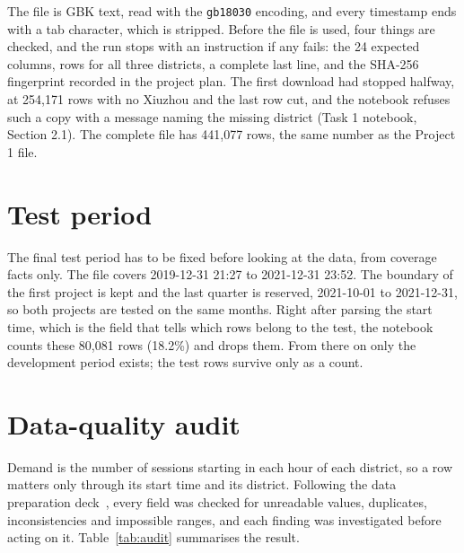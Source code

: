 \documentclass[12pt,a4paper,openany]{report}
\begin{document}
The file is GBK text, read with the \texttt{gb18030} encoding, and every timestamp ends with a tab
character, which is stripped. Before the file is used, four things are checked, and the run stops with an instruction if any fails: the 24
expected columns, rows for all three districts, a complete last line, and the SHA-256 fingerprint recorded in the
project plan. The first download had stopped halfway, at 254,171 rows with no
Xiuzhou and the last row cut, and the notebook refuses such a copy with a message naming the missing district (Task 1
notebook, Section 2.1). The complete file has 441,077 rows, the same number as the Project 1 file.

\section{Test period}\label{sec:test}

The final test period has to be fixed before looking at the data, from coverage facts only. The file covers
2019-12-31 21:27 to 2021-12-31 23:52. The boundary of the first project is kept and the last quarter is reserved,
2021-10-01 to 2021-12-31, so both projects are tested on the same months. Right after parsing the start time, which
is the field that tells which rows belong to the test, the notebook counts these 80,081 rows (18.2\%) and drops them.
From there on only the development period exists; the test rows survive only as a count.

\section{Data-quality audit}\label{sec:audit}

Demand is the number of sessions starting in each hour of each district, so a row matters only through its start
time and its district. Following the data preparation deck~\cite{mindd03}, every field was checked for unreadable
values, duplicates, inconsistencies and impossible ranges, and each finding was investigated before acting on it.
Table~\ref{tab:audit} summarises the result.
\end{document}
